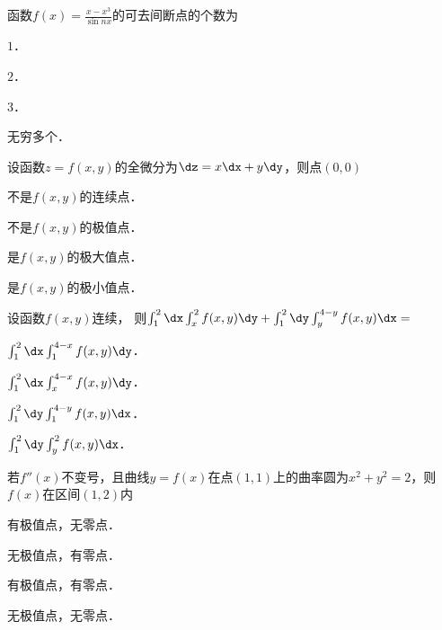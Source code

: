 \documentclass[plain,noanswer,medmath]{../../template/jnuexam}
\begin{document}






\begin{problem}
函数$f(x) = \frac{x - x^3}{\sin nx}$的可去间断点的个数为\pickout{}
\begin{abcd}
\item $1$．
\item $2$．
\item $3$．
\item 无穷多个．
\end{abcd}
\end{problem}




\begin{problem}
设函数$z = f\left(x,y \right)$的全微分为$\dz = x\dx + y\dy$，则点$\left(0,0 \right)$\pickout{}
\begin{abcd}
\item 不是$f\left(x,y \right)$的连续点．
\item 不是$f\left(x,y \right)$的极值点．
\item 是$f\left(x,y \right)$的极大值点．
\item 是$f\left(x,y \right)$的极小值点．
\end{abcd}
\end{problem}


\begin{problem}
设函数$f\left(x,y \right)$连续，
则$\int_1^2 \dx \int_x^2 f(x,y)\dy + \int_1^2 \dy \int_y^{4 - y} f(x,y)\dx =$\pickout{}
\begin{abcd}
\item $\int_1^2 \dx \int_1^{4 - x} f(x,y)\dy$．
\item $\int_1^2 \dx \int_x^{4 - x} f(x,y)\dy$．
\item $\int_1^2 \dy \int_1^{4 - y} f(x,y)\dx$．
\item $\int_1^2 \dy \int_y^2 f(x,y)\dx$．
\end{abcd}
\end{problem}


\begin{problem}
若$f''(x)$不变号，且曲线$y = f(x)$在点$\left(1,1 \right)$上的曲率圆为$x^2 + y^2 = 2$，则$f(x)$在区间$\left(1,2 \right)$内\pickout{}
\begin{abcd}
\item 有极值点，无零点．
\item 无极值点，有零点．
\item 有极值点，有零点．
\item 无极值点，无零点．
\end{abcd}
\end{problem}
\end{document}
